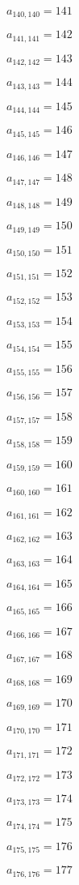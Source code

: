 \documentclass[a4paper,12pt]{article}
\begin{document}
$a _{ 140, 140 } = 141$

$a _{ 141, 141 } = 142$

$a _{ 142, 142 } = 143$

$a _{ 143, 143 } = 144$

$a _{ 144, 144 } = 145$

$a _{ 145, 145 } = 146$

$a _{ 146, 146 } = 147$

$a _{ 147, 147 } = 148$

$a _{ 148, 148 } = 149$

$a _{ 149, 149 } = 150$

$a _{ 150, 150 } = 151$

$a _{ 151, 151 } = 152$

$a _{ 152, 152 } = 153$

$a _{ 153, 153 } = 154$

$a _{ 154, 154 } = 155$

$a _{ 155, 155 } = 156$

$a _{ 156, 156 } = 157$

$a _{ 157, 157 } = 158$

$a _{ 158, 158 } = 159$

$a _{ 159, 159 } = 160$

$a _{ 160, 160 } = 161$

$a _{ 161, 161 } = 162$

$a _{ 162, 162 } = 163$

$a _{ 163, 163 } = 164$

$a _{ 164, 164 } = 165$

$a _{ 165, 165 } = 166$

$a _{ 166, 166 } = 167$

$a _{ 167, 167 } = 168$

$a _{ 168, 168 } = 169$

$a _{ 169, 169 } = 170$

$a _{ 170, 170 } = 171$

$a _{ 171, 171 } = 172$

$a _{ 172, 172 } = 173$

$a _{ 173, 173 } = 174$

$a _{ 174, 174 } = 175$

$a _{ 175, 175 } = 176$

$a _{ 176, 176 } = 177$
\end{document}
